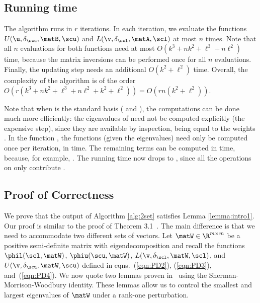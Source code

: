 \subsection{Running time}
\label{sec:runningtime2setS}

The algorithm runs in $r$ iterations. In each iteration, we evaluate the functions $U(\u,\delta_\scu,\matB,\scu)$ and $L(\v,\delta_\scl, \matA,\scl)$ at most $n$ times. Note that all $n$ evaluations for both functions need at most $O(k^3 + nk^2 + \ell^3 + n\ell^2)$ time, because the matrix inversions can be performed once for all $n$ evaluations. Finally, the updating step needs an additional $O(k^2 + \ell^2)$ time. Overall, the complexity of the algorithm is of the order $O(r(k^3 + nk^2 + \ell^3 + n\ell^2 + k^2 + \ell^2) ) = O\left(rn \left(k^2+\ell^2\right)\right)$.

Note that when  is the standard basis
( and ),
the computations can be done much more efficiently:
the
eigenvalues of \math{\matB_\s} need not be computed
explicitly (the expensive step),
since they are available by inspection, being equal to the
weights \math{\s_\tau}.
In the function ,
the functions \math{\phiu} (given the eigenvalues) need only be computed
once per iteration, in  time. The remaining terms can be computed
in  time, because, for example,
.
The running time now drops to , since all the operations
on  only contribute .


\subsection{Proof of Correctness}

We prove that the output of Algorithm \ref{alg:2set} satisfies Lemma \ref{lemma:intro1}. Our proof is similar to the proof of Theorem 3.1~\cite{BSS09}. The main difference is that we need to accommodate two different sets of vectors. Let $\matW \in \R^{m \times m}$ be a positive semi-definite matrix with eigendecomposition
and recall the functions $\phil(\scl,\matW)$, $\phiu(\scu,\matW)$, $L(\v,\delta_\scl,\matW,\scl)$, and $U(\v,\delta_\scu,\matW,\scu)$ defined in eqns.~(\ref{eqn:PD2}), (\ref{eqn:PD3}), and~(\ref{eqn:PD4}). We now quote two lemmas
proven  in~\cite{BSS09} using the Sherman-Morrison-Woodbury identity. These lemmas allow us to control the smallest and largest eigenvalues of $\matW$ under a rank-one perturbation.

